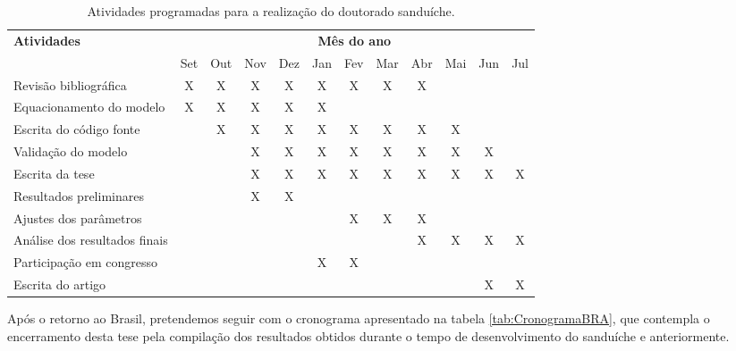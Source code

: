 \begin{table}[h]
    \begin{tabular}{| l|c|c|c|c|c|c|c|c|c|c|c |}
        \textbf{Atividades} & \multicolumn{11}{c}{\textbf{Mês do ano}}                                       \\
                                           & Set & Out & Nov & Dez & Jan & Fev & Mar & Abr & Mai & Jun & Jul \\
\hline        Revisão bibliográfica        &  X  &  X  &  X  &  X  &  X  &  X  &  X  &  X  &     &     &     \\
\hline        Equacionamento do modelo     &  X  &  X  &  X  &  X  &  X  &     &     &     &     &     &     \\
\hline        Escrita do código fonte      &     &  X  &  X  &  X  &  X  &  X  &  X  &  X  &  X  &     &     \\
\hline        Validação do modelo          &     &     &  X  &  X  &  X  &  X  &  X  &  X  &  X  &  X  &     \\
\hline        Escrita da tese              &     &     &  X  &  X  &  X  &  X  &  X  &  X  &  X  &  X  &  X  \\
\hline        Resultados preliminares      &     &     &  X  &  X  &     &     &     &     &     &     &     \\
\hline        Ajustes dos parâmetros       &     &     &     &     &     &  X  &  X  &  X  &     &     &     \\
\hline        Análise dos resultados finais&     &     &     &     &     &     &     &  X  &  X  &  X  &  X  \\
\hline \hline Participação em congresso    &     &     &     &     &  X  &  X  &     &     &     &     &     \\
\hline        Escrita do artigo            &     &     &     &     &     &     &     &     &     &  X  &  X  
    \end{tabular}
    \caption{Atividades programadas para a realização do doutorado sanduíche.}
    \label{tab:CronogramaFRA}
\end{table}

    Após o retorno ao Brasil, pretendemos seguir com o cronograma apresentado na tabela \ref{tab:CronogramaBRA}, que contempla o encerramento desta tese pela compilação dos resultados obtidos durante o tempo de desenvolvimento do sanduíche e anteriormente.

